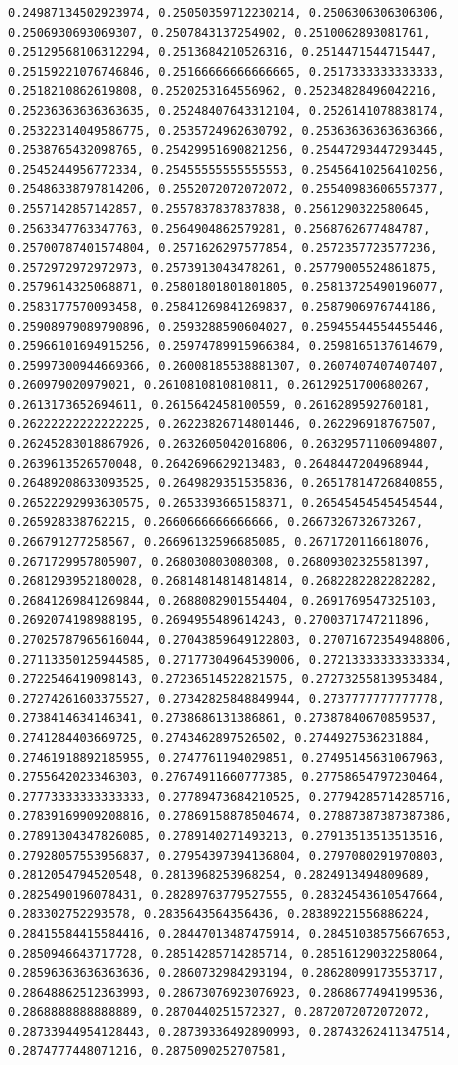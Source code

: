 \documentclass[11pt]{article}
\begin{document}
\begin{Verbatim}[commandchars=\\\{\}]
0.24987134502923974, 0.25050359712230214, 0.2506306306306306, 0.2506930693069307, 0.2507843137254902, 0.2510062893081761, 0.25129568106312294, 0.2513684210526316, 0.2514471544715447, 0.25159221076746846, 0.25166666666666665, 0.2517333333333333, 0.2518210862619808, 0.2520253164556962, 0.25234828496042216, 0.25236363636363635, 0.25248407643312104, 0.2526141078838174, 0.25322314049586775, 0.2535724962630792, 0.25363636363636366, 0.2538765432098765, 0.25429951690821256, 0.25447293447293445, 0.2545244956772334, 0.25455555555555553, 0.25456410256410256, 0.25486338797814206, 0.2552072072072072, 0.25540983606557377, 0.2557142857142857, 0.2557837837837838, 0.2561290322580645, 0.2563347763347763, 0.2564904862579281, 0.2568762677484787, 0.25700787401574804, 0.2571626297577854, 0.2572357723577236, 0.2572972972972973, 0.2573913043478261, 0.25779005524861875, 0.2579614325068871, 0.25801801801801805, 0.25813725490196077, 0.2583177570093458, 0.25841269841269837, 0.2587906976744186, 0.25908979089790896, 0.2593288590604027, 0.25945544554455446, 0.25966101694915256, 0.25974789915966384, 0.2598165137614679, 0.25997300944669366, 0.26008185538881307, 0.2607407407407407, 0.260979020979021, 0.2610810810810811, 0.26129251700680267, 0.2613173652694611, 0.2615642458100559, 0.2616289592760181, 0.26222222222222225, 0.26223826714801446, 0.262296918767507, 0.26245283018867926, 0.2632605042016806, 0.26329571106094807, 0.2639613526570048, 0.2642696629213483, 0.2648447204968944, 0.26489208633093525, 0.2649829351535836, 0.26517814726840855, 0.26522292993630575, 0.2653393665158371, 0.26545454545454544, 0.265928338762215, 0.2660666666666666, 0.2667326732673267, 0.266791277258567, 0.26696132596685085, 0.2671720116618076, 0.2671729957805907, 0.268030803080308, 0.26809302325581397, 0.2681293952180028, 0.26814814814814814, 0.2682282282282282, 0.26841269841269844, 0.2688082901554404, 0.2691769547325103, 0.2692074198988195, 0.2694955489614243, 0.2700371747211896, 0.27025787965616044, 0.27043859649122803, 0.27071672354948806, 0.27113350125944585, 0.27177304964539006, 0.27213333333333334, 0.2722546419098143, 0.27236514522821575, 0.27273255813953484, 0.27274261603375527, 0.27342825848849944, 0.2737777777777778, 0.2738414634146341, 0.2738686131386861, 0.27387840670859537, 0.2741284403669725, 0.2743462897526502, 0.2744927536231884, 0.27461918892185955, 0.2747761194029851, 0.27495145631067963, 0.2755642023346303, 0.27674911660777385, 0.27758654797230464, 0.27773333333333333, 0.27789473684210525, 0.27794285714285716, 0.27839169909208816, 0.27869158878504674, 0.27887387387387386, 0.27891304347826085, 0.2789140271493213, 0.27913513513513516, 0.27928057553956837, 0.27954397394136804, 0.2797080291970803, 0.2812054794520548, 0.2813968253968254, 0.2824913494809689, 0.2825490196078431, 0.28289763779527555, 0.28324543610547664, 0.283302752293578, 0.2835643564356436, 0.28389221556886224, 0.28415584415584416, 0.28447013487475914, 0.28451038575667653, 0.2850946643717728, 0.28514285714285714, 0.28516129032258064, 0.28596363636363636, 0.2860732984293194, 0.28628099173553717, 0.28648862512363993, 0.28673076923076923, 0.2868677494199536, 0.2868888888888889, 0.2870440251572327, 0.2872072072072072, 0.28733944954128443, 0.28739336492890993, 0.28743262411347514, 0.2874777448071216, 0.2875090252707581, 
\end{Verbatim}
\end{document}
